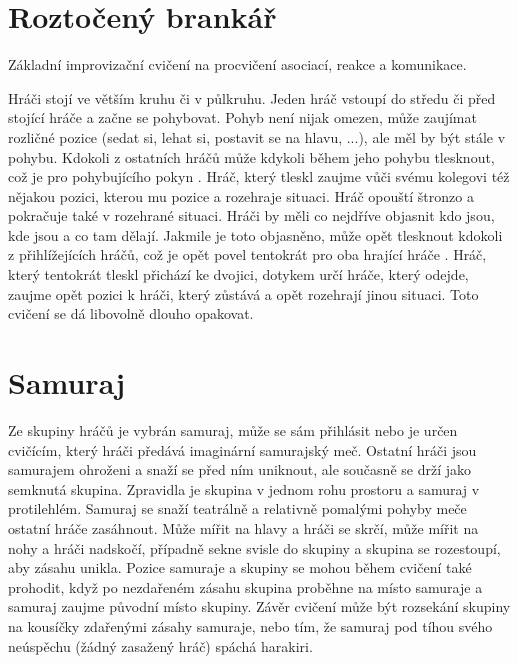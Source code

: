 
 
 
\needspace{5cm} \section{Roztočený brankář} \label{roztočený brankář} Základní improvizační cvičení na procvičení asociací, reakce a komunikace. 
 
Hráči stojí ve větším kruhu či v půlkruhu. Jeden hráč vstoupí do středu či před stojící hráče a začne se pohybovat. Pohyb není nijak omezen, může zaujímat rozličné pozice (sedat si, lehat si, postavit se na hlavu, ...), ale měl by být stále v pohybu. Kdokoli z ostatních hráčů může kdykoli během jeho pohybu tlesknout, což je pro pohybujícího pokyn . Hráč, který tleskl zaujme vůči svému kolegovi též nějakou pozici, kterou mu pozice  a rozehraje situaci. Hráč opouští štronzo a pokračuje také v rozehrané situaci. Hráči by měli co nejdříve objasnit kdo jsou, kde jsou a co tam dělají. Jakmile je toto objasněno, může opět tlesknout kdokoli z přihlížejících hráčů, což je opět povel tentokrát pro oba hrající hráče . Hráč, který tentokrát tleskl přichází ke dvojici, dotykem určí hráče, který odejde, zaujme opět pozici k hráči, který zůstává a opět rozehrají jinou situaci. Toto cvičení se dá libovolně dlouho opakovat. 
 
 
 
 
\needspace{5cm} \section{Samuraj} \label{samuraj} Ze skupiny hráčů je vybrán samuraj, může se sám přihlásit nebo je určen cvičícím, který hráči předává imaginární samurajský meč. Ostatní hráči jsou samurajem ohroženi a snaží se před ním uniknout, ale současně se drží jako semknutá skupina. Zpravidla je skupina v jednom rohu prostoru a samuraj v protilehlém. Samuraj se snaží teatrálně a relativně pomalými pohyby meče ostatní hráče zasáhnout. Může mířit na hlavy a hráči se skrčí, může mířit na nohy a hráči nadskočí, případně sekne svisle do skupiny a skupina se rozestoupí, aby zásahu unikla. Pozice samuraje a skupiny se mohou během cvičení také prohodit, když po nezdařeném zásahu skupina proběhne na místo samuraje a samuraj zaujme původní místo skupiny. Závěr cvičení může být rozsekání skupiny na kousíčky zdařenými zásahy samuraje, nebo tím, že samuraj pod tíhou svého neúspěchu (žádný zasažený hráč) spáchá harakiri. 
 

